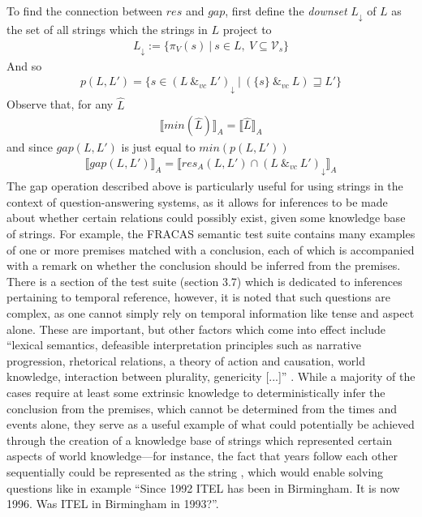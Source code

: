\documentclass[a4paper,12pt,leqno]{article}
\newcommand{\vph}[1]{\vphantom{#1}}
\newcommand{\ebox}[1]{\fbox{$\vph{'(),}#1$}}
\newcommand{\spvc}{~\&_{v\!c}~}
\newcommand{\V}{\mathcal{V}}
\newcommand{\EventString}[1]{%
	\renewcommand*{\do}[1]{\ebox{##1}}%
	\PipeParser{#1}%
}
\begin{document}
To find the connection between $res$ and $gap$, first define the \textit{downset} $L_\downarrow$ of $L$ as the set of all strings which the strings in $L$ project to
\begin{align}
	L_\downarrow := \{ \pi_V(s) ~|~ s \in L,~ V \subseteq \V_s \}
\end{align}
And so
\begin{align}
	p(L, L') = \{s \in (L \spvc L')_\downarrow ~|~ (\{s\} \spvc L) \sqsupseteq L'\}
\end{align}
Observe that, for any $\hat{L}$
\begin{align}
	\llbracket min(\hat{L}) \rrbracket_A = \llbracket \hat{L} \rrbracket_A
\end{align}
and since $gap(L, L')$ is just equal to $min(p(L, L'))$
\begin{align}
	\llbracket gap(L, L') \rrbracket_A = \llbracket res_A(L, L') \cap (L \spvc L')_\downarrow \rrbracket_A
\end{align}
The gap operation described above is particularly useful for using strings in the context of question-answering systems, as it allows for inferences to be made about whether certain relations could possibly exist, given some knowledge base of strings. For example, the FRACAS semantic test suite \citep{cooper1996using} contains many examples of one or more premises matched with a conclusion, each of which is accompanied with a remark on whether the conclusion should be inferred from the premises. There is a section of the test suite (section 3.7) which is dedicated to inferences pertaining to temporal reference, however, it is noted that such questions are complex, as one cannot simply rely on temporal information like tense and aspect alone. These are important, but other factors which come into effect include ``lexical semantics, defeasible interpretation principles such as narrative progression, rhetorical relations, a theory of action and causation, world knowledge, interaction between plurality, genericity [...]'' \citep[p. 101]{cooper1996using}. While a majority of the cases require at least some extrinsic knowledge to deterministically infer the conclusion from the premises, which cannot be determined from the times and events alone, they serve as a useful example of what could potentially be achieved through the creation of a knowledge base of strings which represented certain aspects of world knowledge---for instance, the fact that years follow each other sequentially could be represented as the string \EventString{{}|...|1992|1993|...|{}}, which would enable solving questions like in example \citep[3.252, p. 101]{cooper1996using} ``Since 1992 ITEL has been in Birmingham. It is now 1996. Was ITEL in Birmingham in 1993?''.
\end{document}
